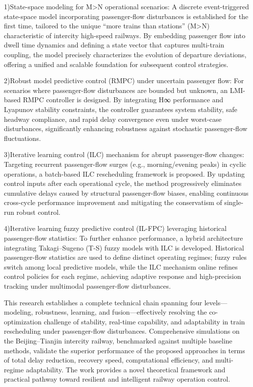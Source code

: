 1)State-space modeling for M>N operational scenarios: A discrete event-triggered state-space model incorporating passenger-flow disturbances is established for the first time, tailored to the unique “more trains than stations” (M>N) characteristic of intercity high-speed railways. By embedding passenger flow into dwell time dynamics and defining a state vector that captures multi-train coupling, the model precisely characterizes the evolution of departure deviations, offering a unified and scalable foundation for subsequent control strategies.

2)Robust model predictive control (RMPC) under uncertain passenger flow: For scenarios where passenger-flow disturbances are bounded but unknown, an LMI-based RMPC controller is designed. By integrating H∞ performance and Lyapunov stability constraints, the controller guarantees system stability, safe headway compliance, and rapid delay convergence even under worst-case disturbances, significantly enhancing robustness against stochastic passenger-flow fluctuations.

3)Iterative learning control (ILC) mechanism for abrupt passenger-flow changes: Targeting recurrent passenger-flow surges (e.g., morning/evening peaks) in cyclic operations, a batch-based ILC rescheduling framework is proposed. By updating control inputs after each operational cycle, the method progressively eliminates cumulative delays caused by structural passenger-flow biases, enabling continuous cross-cycle performance improvement and mitigating the conservatism of single-run robust control.

4)Iterative learning fuzzy predictive control (IL-FPC) leveraging historical passenger-flow statistics: To further enhance performance, a hybrid architecture integrating Takagi–Sugeno (T-S) fuzzy models with ILC is developed. Historical passenger-flow statistics are used to define distinct operating regimes; fuzzy rules switch among local predictive models, while the ILC mechanism online refines control policies for each regime, achieving adaptive response and high-precision tracking under multimodal passenger-flow disturbances.

This research establishes a complete technical chain spanning four levels—modeling, robustness, learning, and fusion—effectively resolving the co-optimization challenge of stability, real-time capability, and adaptability in train rescheduling under passenger-flow disturbances. Comprehensive simulations on the Beijing–Tianjin intercity railway, benchmarked against multiple baseline methods, validate the superior performance of the proposed approaches in terms of total delay reduction, recovery speed, computational efficiency, and multi-regime adaptability. The work provides a novel theoretical framework and practical pathway toward resilient and intelligent railway operation control.






